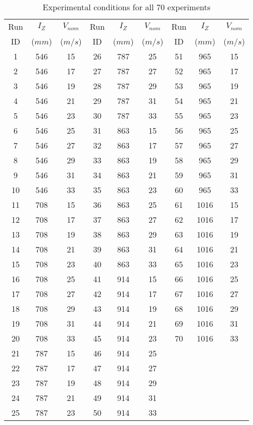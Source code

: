 \begin{table}[H]
\begin{center}
\begin{tabular}{|ccc||ccc||ccc|}
	\hline
	Run & $I_Z$  & $V_{nom}$ & Run & $I_Z$  & $V_{nom}$ & Run & $I_Z$  & $V_{nom}$\\
	ID & ($mm$) & ($m/s$) & ID & ($mm$) & ($m/s$) & ID & ($mm$) & ($m/s$)\\
	\hline
	1 & 546 & 15 & 26 & 787 & 25 & 51 & 965 & 15\\
	2 & 546 & 17 & 27 & 787 & 27 & 52 & 965 & 17\\
	3 & 546 & 19 & 28 & 787 & 29 & 53 & 965 & 19\\
	4 & 546 & 21 & 29 & 787 & 31 & 54 & 965 & 21\\
	5 & 546 & 23 & 30 & 787 & 33 & 55 & 965 & 23\\
	6 & 546 & 25 & 31 & 863 & 15 & 56 & 965 & 25\\
	7 & 546 & 27 & 32 & 863 & 17 & 57 & 965 & 27\\
	8 & 546 & 29 & 33 & 863 & 19 & 58 & 965 & 29\\
	9 & 546 & 31 & 34 & 863 & 21 & 59 & 965 & 31\\
	10 & 546 & 33 & 35 & 863 & 23 & 60 & 965 & 33\\
	11 & 708 & 15 & 36 & 863 & 25 & 61 & 1016 & 15\\
	12 & 708 & 17 & 37 & 863 & 27 & 62 & 1016 & 17\\
	13 & 708 & 19 & 38 & 863 & 29 & 63 & 1016 & 19\\
	14 & 708 & 21 & 39 & 863 & 31 & 64 & 1016 & 21\\
	15 & 708 & 23 & 40 & 863 & 33 & 65 & 1016 & 23\\
	16 & 708 & 25 & 41 & 914 & 15 & 66 & 1016 & 25\\
	17 & 708 & 27 & 42 & 914 & 17 & 67 & 1016 & 27\\
	18 & 708 & 29 & 43 & 914 & 19 & 68 & 1016 & 29\\
	19 & 708 & 31 & 44 & 914 & 21 & 69 & 1016 & 31\\
	20 & 708 & 33 & 45 & 914 & 23 & 70 & 1016 & 33\\
	21 & 787 & 15 & 46 & 914 & 25 &   &   &  \\
	22 & 787 & 17 & 47 & 914 & 27 &   &   &  \\
	23 & 787 & 19 & 48 & 914 & 29 &   &   &  \\
	24 & 787 & 21 & 49 & 914 & 31 &   &   &  \\
	25 & 787 & 23 & 50 & 914 & 33 &   &   &  \\
	\hline
\end{tabular}
\caption{Experimental conditions for all 70 experiments}
\label{table:test_matrix_table}
\end{center}
\end{table}
